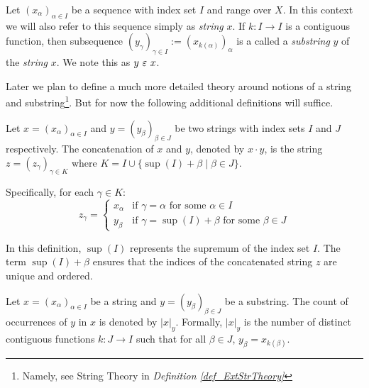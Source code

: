 \begin{definition}\label{def_substr_seq}
  Let $(x_{\alpha})_{\alpha \in I}$ be a sequence with index set $I$ and range over $X$. In this context we will also refer to this sequence simply as \textit{string} $x$. If $k : I \to I$ is a contiguous function, then subsequence $(y_{\gamma})_{\gamma \in I} := (x_{k(\alpha)})_{\alpha}$ is a called a \textit{substring} $y$ of the \textit{string} $x$. We note this as $y \ \varepsilon\  x$.
\end{definition}

Later we plan to define a much more detailed theory around notions of a string and substring\footnote{Namely, see String Theory in \textit{Definition \ref{def_ExtStrTheory}}}. But for now the following additional definitions will suffice.

\begin{definition}\label{def_concat_seq}
  Let \(x = (x_{\alpha})_{\alpha \in I}\) and \(y = (y_{\beta})_{\beta \in J}\) be two strings with index sets \(I\) and \(J\) respectively. The concatenation of \(x\) and \(y\), denoted by \(x \cdot y\), is the string \(z = (z_{\gamma})_{\gamma \in K}\) where \(K = I \cup \{ \sup(I) + \beta \mid \beta \in J \}\).

  Specifically, for each \(\gamma \in K\):
  \[
  z_{\gamma} = 
  \begin{cases} 
      x_{\alpha} & \text{if } \gamma = \alpha \text{ for some } \alpha \in I \\
      y_{\beta} & \text{if } \gamma = \sup(I) + \beta \text{ for some } \beta \in J 
  \end{cases}
  \]

  In this definition, \( \sup(I) \) represents the supremum of the index set \(I\). The term \( \sup(I) + \beta \) ensures that the indices of the concatenated string \(z\) are unique and ordered.
\end{definition}

\begin{definition}\label{def_subcount_seq}
  Let \(x = (x_{\alpha})_{\alpha \in I}\) be a string and \(y = (y_{\beta})_{\beta \in J}\) be a substring. The count of occurrences of \(y\) in \(x\) is denoted by \(|x|_y\). Formally, \(|x|_y\) is the number of distinct contiguous functions \(k: J \to I\) such that for all \(\beta \in J\), \(y_{\beta} = x_{k(\beta)}\).
\end{definition}

